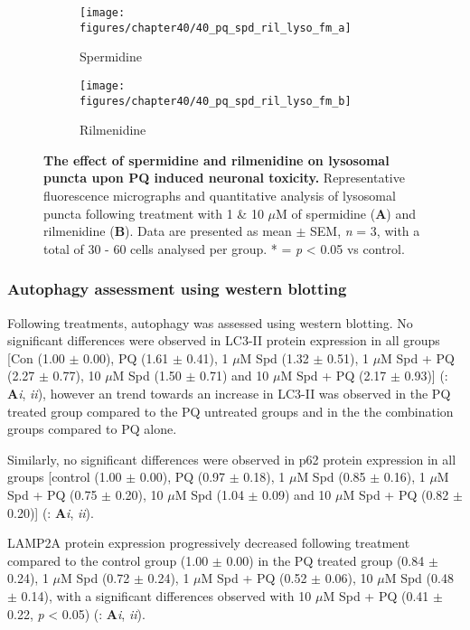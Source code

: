 \begin{figure}[!htbp]
  \center
  \begin{subfigure}[b]{0.495\linewidth}
    \texttt{[image: figures/chapter40/40\_pq\_spd\_ril\_lyso\_fm\_a]}
    \caption{Spermidine}
  \end{subfigure}
  \begin{subfigure}[b]{0.495\linewidth}
    \texttt{[image: figures/chapter40/40\_pq\_spd\_ril\_lyso\_fm\_b]}
    \caption{Rilmenidine}
  \end{subfigure}
  \caption[The effect of spermidine and rilmenidine on lysosomal puncta upon PQ-induced neuronal toxicity]{\textbf{The effect of spermidine and rilmenidine on lysosomal puncta upon PQ induced neuronal toxicity.} Representative fluorescence micrographs and quantitative analysis of lysosomal puncta following treatment with 1 \& 10 $\mu$M of spermidine (\textbf{A}) and rilmenidine (\textbf{B}). Data are presented as mean $\pm$ SEM, \textit{n} = 3, with a total of 30 - 60 cells analysed per group. * = \textit{p} < 0.05 vs control.}
  \label{fig:40_pq_spd_ril_lyso_fm_a}
\end{figure}

\subsubsection{Autophagy assessment using western blotting}
Following treatments, autophagy was assessed using western blotting. No significant differences were observed in LC3-II protein expression in all groups [Con (1.00 $\pm$ 0.00), PQ (1.61 $\pm$ 0.41), 1 $\mu$M Spd (1.32 $\pm$ 0.51), 1 $\mu$M Spd + PQ (2.27 $\pm$ 0.77), 10 $\mu$M Spd (1.50 $\pm$ 0.71) and 10 $\mu$M Spd + PQ (2.17 $\pm$ 0.93)] (: \textbf{A}\textit{i}, \textit{ii}), however an trend towards an increase in LC3-II was observed in the PQ treated group compared to the PQ untreated groups and in the the combination groups compared to PQ alone.

Similarly, no significant differences were observed in p62 protein expression in all groups [control (1.00 $\pm$ 0.00), PQ (0.97 $\pm$ 0.18), 1 $\mu$M Spd (0.85 $\pm$ 0.16), 1 $\mu$M Spd + PQ (0.75 $\pm$ 0.20), 10 $\mu$M Spd (1.04 $\pm$ 0.09) and 10 $\mu$M Spd + PQ (0.82 $\pm$ 0.20)] (: \textbf{A}\textit{i}, \textit{ii}).

LAMP2A protein expression progressively decreased following treatment compared to the control group (1.00 $\pm$ 0.00) in the PQ treated group (0.84 $\pm$ 0.24), 1 $\mu$M Spd (0.72 $\pm$ 0.24), 1 $\mu$M Spd + PQ (0.52 $\pm$ 0.06), 10 $\mu$M Spd (0.48 $\pm$ 0.14), with a  significant differences observed with 10 $\mu$M Spd + PQ (0.41 $\pm$ 0.22, \textit{p} < 0.05) (: \textbf{A}\textit{i}, \textit{ii}). 

